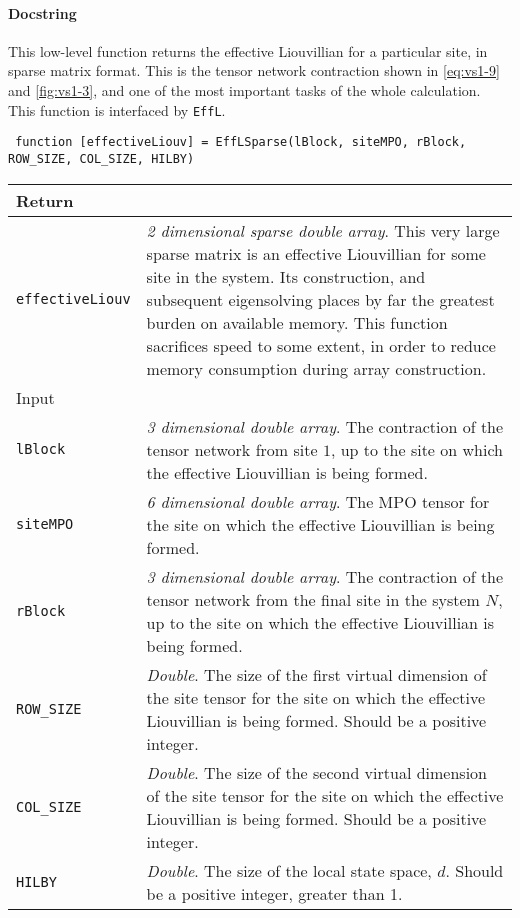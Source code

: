  \paragraph{Docstring} This low-level function returns the effective Liouvillian for a particular site, in sparse matrix format. This is the tensor network contraction shown in \cref{eq:vs1-9} and \cref{fig:vs1-3}, and one of the most important tasks of the whole calculation. This function is interfaced by \lstinline$EffL$.
 \begin{lstlisting}
 function [effectiveLiouv] = EffLSparse(lBlock, siteMPO, rBlock, ROW_SIZE, COL_SIZE, HILBY) \end{lstlisting}
 \begin{longtabu}{X[1,1]X[4,1]}
 \hline
 Return & \\ \hline
 \lstinline$effectiveLiouv$ & \emph{2 dimensional sparse double array}. This very large sparse matrix is an effective Liouvillian for some site in the system. Its construction, and subsequent eigensolving places by far the greatest burden on available memory. This function sacrifices speed to some extent, in order to reduce memory consumption during array construction. \\ \hline
 Input & \\ \hline
 \lstinline$lBlock$ & \emph{3 dimensional double array}. The contraction of the tensor network from site \(1\), up to the site on which the effective Liouvillian is being formed. \\
 \lstinline$siteMPO$ & \emph{6 dimensional double array}. The MPO tensor for the site on which the effective Liouvillian is being formed. \\
 \lstinline$rBlock$ & \emph{3 dimensional double array}. The contraction of the tensor network from the final site in the system \(N\), up to the site on which the effective Liouvillian is being formed. \\
 \lstinline$ROW_SIZE$ & \emph{Double}. The size of the first virtual dimension of the site tensor for the site on which the effective Liouvillian is being formed. Should be a positive integer. \\
 \lstinline$COL_SIZE$ & \emph{Double}. The size of the second virtual dimension of the site tensor for the site on which the effective Liouvillian is being formed. Should be a positive integer. \\
 \lstinline$HILBY$ & \emph{Double}. The size of the local state space, \(d\). Should be a positive integer, greater than 1. \\
 \hline
 \end{longtabu}
